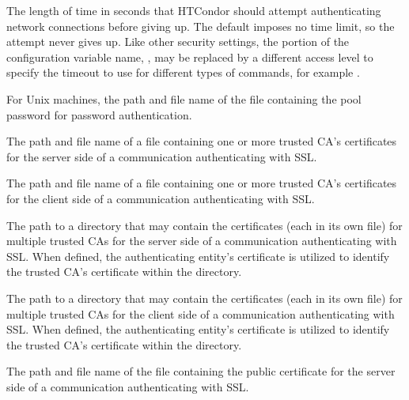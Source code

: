 \begin{description}
\label{param:SecDefaultAuthenticationTimeout}
\item[\Macro{SEC\_DEFAULT\_AUTHENTICATION\_TIMEOUT}]
  The length of time in seconds that HTCondor should attempt
  authenticating network connections before giving up.
  The default imposes no time limit, so the attempt never gives up.
  Like other security settings, the portion of the configuration variable
  name, , 
  may be replaced by a different access level to specify the timeout to use for
  different types of commands, for example
  .

\label{param:SecPasswordFile}
\item[\Macro{SEC\_PASSWORD\_FILE}]
  For Unix machines, the path and file name
  of  the file containing the pool password for password authentication.


\label{param:AuthSSLServerCAFile}
\item[\Macro{AUTH\_SSL\_SERVER\_CAFILE}]
  The path and file name of
  a file containing one or more trusted CA's certificates
  for the server side of a communication authenticating 
  with SSL.

\label{param:AuthSSLClientCAFile}
\item[\Macro{AUTH\_SSL\_CLIENT\_CAFILE}]
  The path and file name of
  a file containing one or more trusted CA's certificates
  for the client side of a communication authenticating 
  with SSL.


\label{param:AuthSSLServerCADir}  
\item[\Macro{AUTH\_SSL\_SERVER\_CADIR}]
  The path to a directory that may contain the 
  certificates (each in its own file) for multiple trusted CAs 
  for the server side of a communication authenticating 
  with SSL.
  When defined, the authenticating entity's certificate 
  is utilized to identify the trusted CA's certificate
  within the directory.

\label{param:AuthSSLClientCADir} 
\item[\Macro{AUTH\_SSL\_CLIENT\_CADIR}]
  The path to a directory that may contain the 
  certificates (each in its own file) for multiple trusted CAs 
  for the client side of a communication authenticating with SSL.
  When defined, the authenticating entity's certificate 
  is utilized to identify the trusted CA's certificate
  within the directory.


\label{param:AuthSSLServerCertfile}  
\item[\Macro{AUTH\_SSL\_SERVER\_CERTFILE}]
  The path and file name of the file containing the public certificate
  for the server side of a communication authenticating with SSL.


\end{description}
